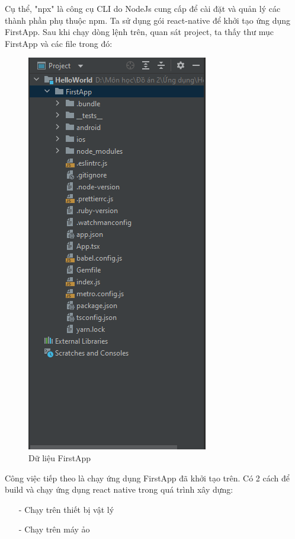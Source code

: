 Cụ thể, "npx" là công cụ CLI do NodeJs cung cấp để cài đặt và quản lý các thành phần phụ thuộc npm. Ta sử dụng gói react-native để khởi tạo ứng dụng FirstApp.
Sau khi chạy dòng lệnh trên, quan sát project, ta thấy thư mục FirstApp và các file trong đó:
\begin{figure}[!ht]
    \centering
    \includegraphics[scale=0.5]{images/firstAppData.png}
    \caption{Dữ liệu FirstApp}
\end{figure}
\newline
Công việc tiếp theo là chạy ứng dụng FirstApp đã khởi tạo trên. Có 2 cách để build và chạy ứng dụng react native trong quá trình xây dựng:
\begin{enumerate}
    \item[-] Chạy trên thiết bị vật lý
    \item[-] Chạy trên máy ảo
\end{enumerate}


